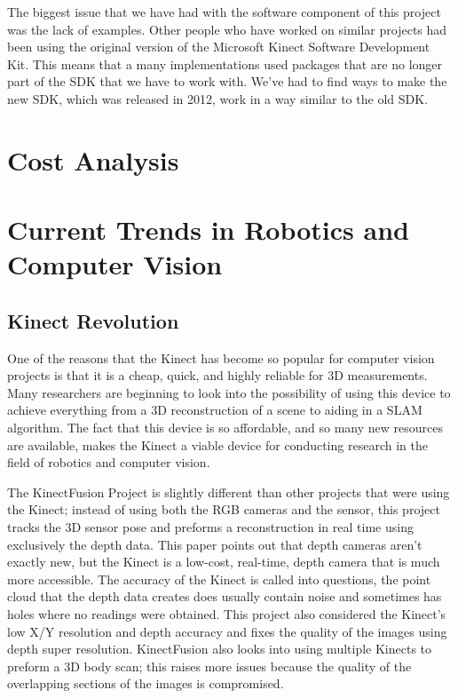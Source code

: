 \documentclass[pdftex,10.5pt]{report}
\begin{document}
The biggest issue that we have had with the software component of this project was the lack of examples. Other people who have worked on similar projects had been using the original version of the Microsoft Kinect Software Development Kit. This means that a many implementations used packages that are no longer part of the SDK that we have to work with. We've had to find ways to make the new SDK, which was released in 2012, work in a way similar to the old SDK. 

\section{Cost Analysis}


\section{Current Trends in Robotics and Computer Vision}

\subsection{Kinect Revolution}
One of the reasons that the Kinect has become so popular for computer vision projects is that it is a cheap, quick, and highly reliable for 3D measurements. Many researchers are beginning to look into the possibility of using this device to achieve everything from a 3D reconstruction of a scene to aiding in a SLAM algorithm. The fact that this device is so affordable, and so many new resources are available, makes the Kinect a viable device for conducting research in the field of robotics and computer vision.

The KinectFusion Project is slightly different than other projects that were using the Kinect; instead of using both the RGB cameras and the sensor, this project tracks the 3D sensor pose and preforms a reconstruction in real time using exclusively the depth data. This paper points out that depth cameras aren't exactly new, but the Kinect is a low-cost, real-time, depth camera that is much more accessible. The accuracy of the Kinect is called into questions, the point cloud that the depth data creates does usually contain noise and sometimes has holes where no readings were obtained. This project also considered the Kinect's low X/Y resolution and depth accuracy and fixes the quality of the images using depth super resolution. KinectFusion also looks into using multiple Kinects to preform a 3D body scan; this raises more issues because the quality of the overlapping sections of the images is compromised.
\end{document}
